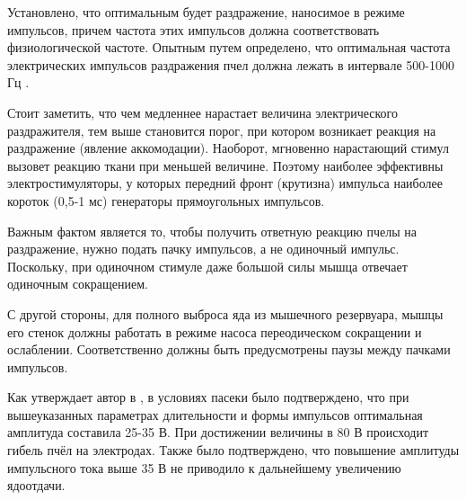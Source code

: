 Установлено, что оптимальным будет раздражение, наносимое в режиме импульсов, причем частота этих импульсов должна соответствовать физиологической частоте. Опытным путем определено, что оптимальная частота электрических импульсов раздражения пчел должна лежать в интервале 500-1000 Гц \cite{Krylov_1995}.

Стоит заметить, что чем медленнее нарастает величина электрического раздражителя, тем выше становится порог, при котором возникает реакция на раздражение (явление аккомодации). Наоборот, мгновенно нарастающий стимул вызовет реакцию ткани при меньшей величине. Поэтому наиболее эффективны электростимуляторы, у которых передний фронт (крутизна) импульса наиболее короток (0,5-1 мс) \longndash генераторы прямоугольных импульсов.

Важным фактом является то, чтобы получить ответную реакцию пчелы на раздражение, нужно подать пачку импульсов, а не одиночный импульс. Поскольку, при одиночном стимуле даже большой силы мышца отвечает одиночным сокращением.

С другой стороны, для полного выброса яда из мышечного резервуара, мышцы его стенок должны работать в режиме насоса \longndash переодическом сокращении и ослаблении. Соответственно должны быть предусмотрены паузы между пачками импульсов.

Как утверждает автор в \cite{Krylov_1995}, в условиях пасеки было подтверждено, что при вышеуказанных параметрах длительности и формы импульсов оптимальная амплитуда составила 25-35 В. При достижении величины в 80 В происходит гибель пчёл на электродах. Также было подтверждено, что повышение амплитуды импульсного тока выше 35 В не приводило к дальнейшему увеличению ядоотдачи.